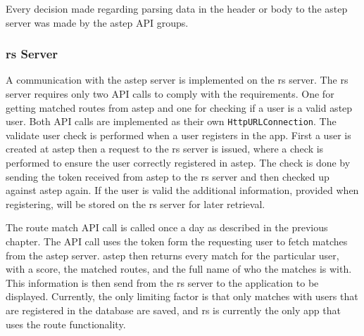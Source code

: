 Every decision made regarding parsing data in the header or body to the \gls{astep} server was made by the \gls{astep} API groups.

\subsubsection{\gls{rs} Server}
A communication with the \gls{astep} server is implemented on the \gls{rs} server.
The \gls{rs} server requires only two API calls to comply with the requirements.
One for getting matched routes from \gls{astep} and one for checking if a user is a valid \gls{astep} user.
Both API calls are implemented as their own \texttt{HttpURLConnection}.
The validate user check is performed when a user registers in the app. 
First a user is created at \gls{astep} then a request to the \gls{rs} server is issued, where a check is performed to ensure the user correctly registered in \gls{astep}.
The check is done by sending the token received from \gls{astep} to the \gls{rs} server and then checked up against \gls{astep} again.
If the user is valid the additional information, provided when registering, will be stored on the \gls{rs} server for later retrieval. 

The route match API call is called once a day as described in the previous chapter.
The API call uses the token form the requesting user to fetch matches from the \gls{astep} server. 
\gls{astep} then returns every match for the particular user, with a score, the matched routes, and the full name of who the matches is with.
This information is then send from the \gls{rs} server to the application to be displayed.
Currently, the only limiting factor is that only matches with users that are registered in the database are saved, and \gls{rs} is currently the only app that uses the route functionality.
